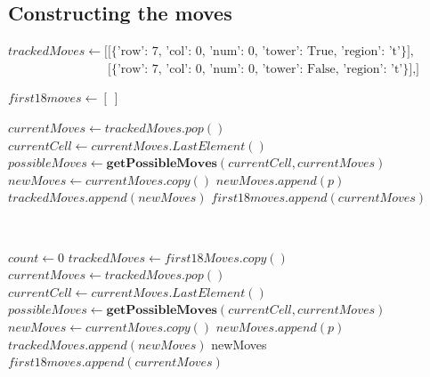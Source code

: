 \documentclass{article}
\begin{document}







\subsection{Constructing the moves}

\begin{algorithm}[H]
\caption{Construct a sequence of moves}
\begin{algorithmic}
\State$trackedMoves \gets \text{[[\{'row': 7, 'col': 0, 'num': 0, 'tower':  True, 'region': 't'\}],}$
\State$\qquad\qquad\qquad\qquad\text{[\{'row': 7, 'col': 0, 'num': 0, 'tower': False, 'region': 't'\}],]}$

\State$first18moves \gets [ \ ]$

\State $currentMoves \gets trackedMoves.pop()$
\State $currentCell \gets currentMoves.LastElement()$
\State $possibleMoves \gets \textbf{getPossibleMoves}(currentCell,currentMoves)$
\State $ newMoves \gets currentMoves.copy()$
\State $ newMoves.append(p)$
\State $ trackedMoves.append(newMoves)$
\EndIf
\EndFor
{}
\State$first18moves.append(currentMoves)$ 
\EndIf
\EndWhile
\EndFunction

\

\State$count \gets 0 $
 
\State$trackedMoves \gets first18Moves.copy()$
\State $currentMoves \gets trackedMoves.pop()$
\State $currentCell \gets currentMoves.LastElement()$
\State $possibleMoves \gets \textbf{getPossibleMoves}(currentCell,currentMoves)$
\State $ newMoves \gets currentMoves.copy()$
\State $ newMoves.append(p)$
\State $ trackedMoves.append(newMoves)$
\State \Return newMoves
\EndIf
\EndIf
\EndFor
{}
\State$first18moves.append(currentMoves)$ 
\EndIf
\EndWhile
\EndFor
\EndFunction


\end{algorithmic}
\end{algorithm}
\end{document}

